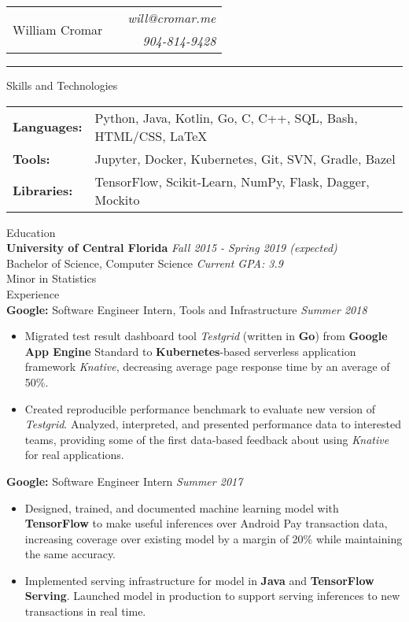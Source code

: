 \documentclass[letterpaper,11pt,oneside]{article}
\newcommand{\mkheader}[3]{
  {\fontfamily{pag}\selectfont
  \begin{tabularx}{\textwidth}{lXr}
    \multirow{2}{*}{\Huge #1} && \emph{#2}
    \\ && \emph{#3}
  \end{tabularx}
  }
  \vspace{2pt}
  \hrule
}
\newcommand{\resheader}[2][]{
  \vspace{9pt}
  {\LARGE #2} #1
  \\
}
\newcommand{\ressubheader}[3][]{
  \vspace{6pt}
  {\textbf{#2} #1} \hfill \emph{#3}
  \\
}
\newcommand{\resskill}[1]{\textbf{#1}}
\begin{document}
\mkheader{William Cromar}{will@cromar.me}{904-814-9428}

\resheader{Skills and Technologies}
\vspace{6pt}
\begin{tabular}{>{\bfseries}l@{\hskip .25cm} l}
  Languages: & Python, Java, Kotlin, Go, C, C++, SQL, Bash, HTML/CSS, LaTeX \\
  Tools: & Jupyter, Docker, Kubernetes, Git, SVN, Gradle, Bazel \\
  Libraries: & TensorFlow, Scikit-Learn, NumPy, Flask, Dagger, Mockito \\
\end{tabular}


\resheader{Education}
\ressubheader{University of Central Florida}{Fall 2015 - Spring 2019 (expected)}
Bachelor of Science, Computer Science \hfill \emph{Current GPA: 3.9} \\
Minor in Statistics \\

\resheader{Experience}
\ressubheader[Software Engineer Intern, Tools and Infrastructure]{Google:}{Summer 2018}
\begin{itemize}
  \item Migrated test result dashboard tool \emph{Testgrid} (written in \resskill{Go}) from \resskill{Google App Engine} Standard to \resskill{Kubernetes}-based serverless application framework \emph{Knative}, decreasing average page response time by an average of 50\%.
  \item Created reproducible performance benchmark to evaluate new version of \emph{Testgrid}. Analyzed, interpreted, and presented performance data to interested teams, providing some of the first data-based feedback about using \emph{Knative} for real applications.
\end{itemize}

\ressubheader[Software Engineer Intern]{Google:}{Summer 2017}
\begin{itemize}
  \item Designed, trained, and documented machine learning model with \resskill{TensorFlow} to make useful inferences over Android Pay transaction data, increasing coverage over existing model by a margin of 20\% while maintaining the same accuracy.
  \item Implemented serving infrastructure for model in \resskill{Java} and \resskill{TensorFlow Serving}. Launched model in production to support serving inferences to new transactions in real time.
\end{itemize}
\end{document}
